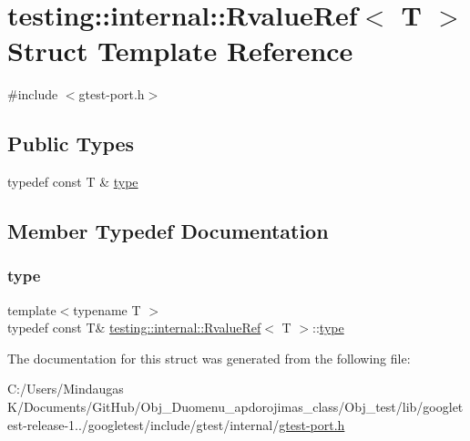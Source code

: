 \hypertarget{structtesting_1_1internal_1_1_rvalue_ref}{}\section{testing\+::internal\+::Rvalue\+Ref$<$ T $>$ Struct Template Reference}
\label{structtesting_1_1internal_1_1_rvalue_ref}


{\ttfamily \#include $<$gtest-\/port.\+h$>$}

\subsection*{Public Types}
\begin{DoxyCompactItemize}
\item 
typedef const T \& \mbox{\hyperlink{structtesting_1_1internal_1_1_rvalue_ref_ad09f1fbc87569c7e2837274193097e44}{type}}
\end{DoxyCompactItemize}


\subsection{Member Typedef Documentation}
\mbox{\label{structtesting_1_1internal_1_1_rvalue_ref_ad09f1fbc87569c7e2837274193097e44}} 
\subsubsection{\texorpdfstring{type}{type}}
{\footnotesize\ttfamily template$<$typename T $>$ \\
typedef const T\& \mbox{\hyperlink{structtesting_1_1internal_1_1_rvalue_ref}{testing\+::internal\+::\+Rvalue\+Ref}}$<$ T $>$\+::\mbox{\hyperlink{structtesting_1_1internal_1_1_rvalue_ref_ad09f1fbc87569c7e2837274193097e44}{type}}}



The documentation for this struct was generated from the following file\+:\begin{DoxyCompactItemize}
\item 
C\+:/\+Users/\+Mindaugas K/\+Documents/\+Git\+Hub/\+Obj\+\_\+\+Duomenu\+\_\+apdorojimas\+\_\+class/\+Obj\+\_\+test/lib/googletest-\/release-\/1../googletest/include/gtest/internal/\mbox{\hyperlink{_obj__test_2lib_2googletest-release-1_88_81_2googletest_2include_2gtest_2internal_2gtest-port_8h}{gtest-\/port.\+h}}\end{DoxyCompactItemize}
